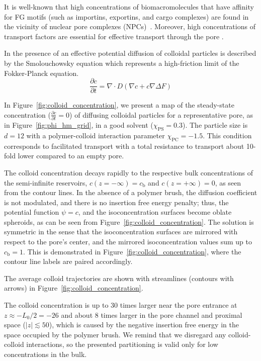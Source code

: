 \documentclass[12pt, a4paper]{article}
\newcommand\todo[1]{\textcolor{red}{#1}}
\begin{document}
It is well-known that high concentrations of biomacromolecules that have affinity for FG motifs (such as importins, exportins, and cargo complexes) are found in the vicinity of nuclear pore complexes (NPCs)~\cite{Beck2007, Gruenwald2010, Tu2011}.
Moreover, high concentrations of transport factors are essential for effective transport through the pore \cite{Lowe2019}. 

In the presence of an effective potential diffusion of colloidal particles is described by the Smolouchowsky equation which represents a high-friction limit of the Fokker-Planck equation.\cite{Risken1996}
\begin{equation}
    \label{eq:Smoluchowski}
    \frac{\partial c}{\partial t} = \nabla \cdot D(\nabla c + c \nabla \Delta F)
\end{equation}

In Figure~\ref{fig:colloid_concentration}, we present a map of the steady-state concentration ($\frac{\partial c}{\partial t} = 0$) of diffusing colloidal particles for a representative pore, as in Figure~\ref{fig:phi_hm_grid}, in a good solvent ($\chi_{\text{PS}} = 0.3$).
The particle size is $d = 12$ with a polymer-colloid interaction parameter $\chi_{\text{PC}} = -1.5$.
This condition corresponds to facilitated transport with a total resistance to transport about 10-fold lower compared to an empty pore.

The colloid concentration decays rapidly to the respective bulk concentrations of the semi-infinite reservoirs, $c(z = -\infty) = c_{\text{b}}$ and $c(z = +\infty) = 0$, as seen from the contour lines.
In the absence of a polymer brush, the diffusion coefficient is not modulated, and there is no insertion free energy penalty; thus, the potential function $\psi = c$, and the isoconcentration surfaces become oblate spheroids, as can be seen from Figure~\ref{fig:colloid_concentration}.
The solution is symmetric in the sense that the isoconcentration surfaces are mirrored with respect to the pore's center, and the mirrored isoconcentration values sum up to $c_{\text{b}} = 1$.
This is demonstrated in Figure~\ref{fig:colloid_concentration}, where the contour line labels are paired accordingly.

The average colloid trajectories are shown with streamlines (contours with arrows) in Figure~\ref{fig:colloid_concentration}.

The colloid concentration is up to 30 times larger near the pore entrance at $z \approx -L_{0}/2 = -26$ and about 8 times larger in the pore channel and proximal space ($|z| \lesssim 50$), which is caused by the negative insertion free energy in the space occupied by the polymer brush.
We remind that we disregard any colloid-colloid interactions, so the presented partitioning is valid only for low concentrations in the bulk.
\end{document}
